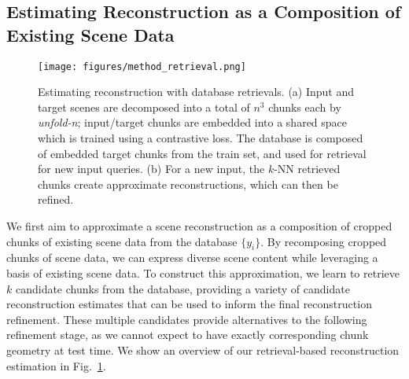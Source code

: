 \subsection{Estimating Reconstruction as a Composition of Existing Scene Data}

\begin{figure}
	\centering
	\texttt{[image: figures/method\_retrieval.png]}
	\vspace{-0.6cm}
	\caption{
	Estimating reconstruction with database retrievals. 
	(a) Input and target scenes are decomposed into a total of $n^3$ chunks each by \textit{unfold-n}; input/target chunks are embedded into a shared space which is trained using a contrastive loss.
	The database is composed of embedded target chunks from the train set, and used for retrieval for new input queries.
	(b) For a new input, the $k$-NN retrieved chunks create approximate reconstructions, which can then be refined.
	}
	\label{fig:method_retrieval}
	\vspace{-0.25cm}
\end{figure}

We first aim to approximate a scene reconstruction as a composition of cropped chunks of existing scene data from the database $\{y_i\}$.
%
By recomposing cropped chunks of scene data, we can express diverse scene content while leveraging a basis of existing scene data.
%
To construct this approximation, we learn to retrieve $k$ candidate chunks from the database, providing a variety of candidate reconstruction estimates that can be used to inform the final reconstruction refinement.
These multiple candidates provide alternatives to the following refinement stage, as we cannot expect to have exactly corresponding chunk geometry at test time.
%
We show an overview of our retrieval-based reconstruction estimation in Fig.~\ref{fig:method_retrieval}.

